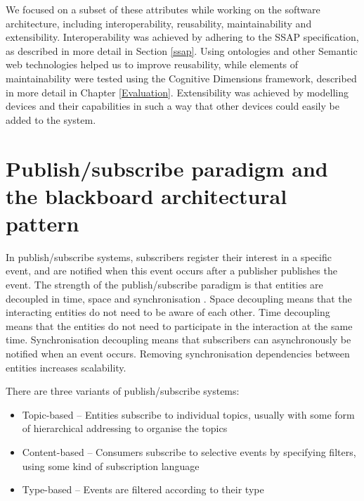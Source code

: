 We focused on a subset of these attributes while working on the software architecture, including interoperability, reusability, maintainability and extensibility. Interoperability was achieved by adhering to the \ac{SSAP} specification, as described in more detail in Section \ref{ssap}. Using ontologies and other Semantic web technologies helped us to improve reusability, while elements of maintainability were tested using the Cognitive Dimensions framework, described in more detail in Chapter \ref{Evaluation}. Extensibility was achieved by modelling devices and their capabilities in such a way that other devices could easily be added to the system.
% 


\section{Publish/subscribe paradigm and the blackboard architectural pattern}
\label{pubsubblackboard}
In publish/subscribe systems, subscribers register their interest in a specific event, and are notified when this event occurs after a publisher publishes the event. The strength of the publish/subscribe par\-a\-digm is that entities are decoupled in time, space and synchronisation \cite{Eugster2003}. Space decoupling means that the interacting entities do not need to be aware of each other. Time decoupling means that the entities do not need to participate in the interaction at the same time. Synchronisation decoupling means that subscribers can asynchronously be notified when an event occurs. Removing synchronisation dependencies between entities increases scalability.

There are three variants of publish/subscribe systems:

\begin{itemize}
	\item Topic-based -- Entities subscribe to individual topics, usually with some form of hierarchical addressing to organise the topics
	\item Content-based -- Consumers subscribe to selective events by specifying filters, using some kind of subscription language
	\item Type-based -- Events are filtered according to their type
\end{itemize}

